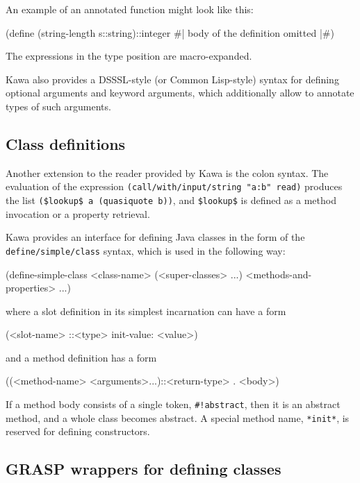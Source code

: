 \documentclass[acmsmall]{acmart}
\newenvironment{Snippet}{\Verbatim[samepage=true]}{\endVerbatim}
\begin{document}
An example of an annotated function might look like this:

\begin{Snippet}
  (define (string-length s::string)::integer
     #| body of the definition omitted |#)
\end{Snippet}

The expressions in the type position are macro-expanded.

Kawa also provides a DSSSL-style (or Common Lisp-style) syntax for
defining optional arguments and keyword arguments, which additionally
allow to annotate types of such arguments.

\subsection*{Class definitions}

Another extension to the reader provided by Kawa is the colon
syntax. The evaluation of the expression
\texttt{(call\-/with\-/input\-/string "a:b" read)} produces the list
\texttt{(\$lookup\$ a (quasiquote b))}, and \texttt{\$lookup\$} is
defined as a method invocation or a property retrieval.

Kawa provides an interface for defining Java classes in the form of
the \texttt{define\-/simple\-/class} syntax, which is used in the
following way:

\begin{Snippet}
  (define-simple-class <class-name> (<super-classes> ...)
    <methods-and-properties>
    ...)
\end{Snippet}

where a slot definition in its simplest incarnation can have a form

\begin{Snippet}
  (<slot-name> ::<type> init-value: <value>)
\end{Snippet}


and a method definition has a form

\begin{Snippet}
  ((<method-name> <arguments>...)::<return-type> . <body>)
\end{Snippet}

If a method body consists of a single token, \texttt{\#!abstract},
then it is an abstract method, and a whole class becomes abstract.
A special method name, \texttt{*init*}, is reserved for defining
constructors.

\subsection*{GRASP wrappers for defining classes}
\end{document}
